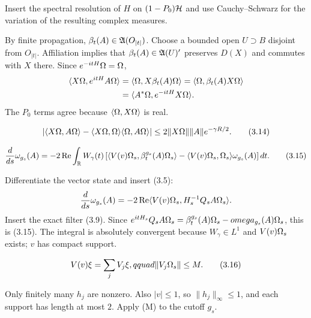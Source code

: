 \documentclass[11pt,a4paper]{article}
\begin{document}
\Because Insert the spectral resolution of $H$ on $(1-P_0)\mathcal H$ and use
Cauchy--Schwarz for the variation of the resulting complex measures.


\Because By finite propagation, $\beta_t(A)\in\mathfrak A(O_{|t|})$.  Choose a bounded
open $U\supset B$ disjoint from $O_{|t|}$.  Affiliation implies that
$\beta_t(A)\in\mathfrak A(U)'$ preserves $D(X)$ and commutes with $X$ there.  Since
$e^{-itH}\Omega=\Omega$,
\begin{align*}
 \langle X\Omega,e^{itH}A\Omega\rangle
 &=\langle \Omega,X\beta_t(A)\Omega\rangle
  =\langle \Omega,\beta_t(A)X\Omega\rangle\\
 &=\langle A^*\Omega,e^{-itH}X\Omega\rangle.
\end{align*}
The $P_0$ terms agree because $\langle \Omega,X\Omega\rangle$ is real.

\[
 \left|\langle X\Omega,A\Omega\rangle-\langle X\Omega,\Omega\rangle\langle \Omega,A\Omega\rangle\right|
 \leq2\|X\Omega\|\|A\|e^{-\gamma R/2}.                              \tag{3.14}
\]

\QedStep


\[
 \frac d{ds}\omega_{g_s}(A)
 =-2\operatorname{Re}\int_\mathbb R W_\gamma(t)
 \left[\langle V(v)\Omega_s,\beta_t^{g_s}(A)\Omega_s\rangle
 -\langle V(v)\Omega_s,\Omega_s\rangle\omega_{g_s}(A)\right]dt.                 \tag{3.15}
\]

\Because Differentiate the vector state and insert (3.5):
\[
 \frac d{ds}\omega_{g_s}(A)
 =-2\operatorname{Re}\langle V(v)\Omega_s,H_s^{-1}Q_sA\Omega_s\rangle.
\]
Insert the exact filter (3.9).  Since
$e^{itH_s}Q_sA\Omega_s=\beta_t^{g_s}(A)\Omega_s-omega_{g_s}(A)\Omega_s$,
this is (3.15).  The integral is absolutely convergent because
$W_\gamma\in L^1$ and $V(v)\Omega_s$ exists; $v$ has compact support.

\[
 V(v)\xi=\sum_jV_j\xi,qquad \|V_j\Omega_s\|\leq M.                  \tag{3.16}
\]

\Because Only finitely many $h_j$ are nonzero.  Also $|v|\leq1$, so
$\|h_j\|_\infty\leq1$, and each support has length at most $2$.  Apply (M) to
the cutoff $g_s$.

\QedStep

\end{document}
